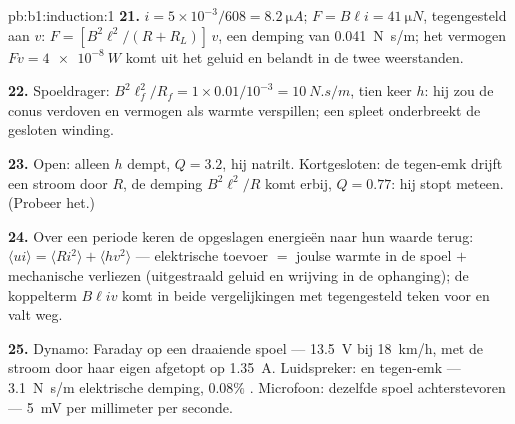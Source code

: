 \begin{solution}{pb:b1:induction:1}
\textbf{21.} $i = 5 \times 10^{-3}/608 = \qty{8.2}{\micro A}$; $F = B\ell i = \qty{41}{\micro N}$,
tegengesteld aan $v$: $F = [B^2\ell^2/(R + R_L)]\,v$, een demping van \qty{0.041}{N.s/m};
het vermogen $Fv = \qty{4e-8}{W}$ komt uit het geluid en belandt in de
twee weerstanden.

\textbf{22.} Spoeldrager: $B^2\ell_f^2/R_f = 1 \times 0.01/10^{-3} = \qty{10}{N.s/m}$, tien
keer $h$: hij zou de conus verdoven en vermogen als warmte verspillen; een spleet
onderbreekt de gesloten winding.

\textbf{23.} Open: alleen $h$ dempt, $Q = 3.2$, hij natrilt. Kortgesloten: de
tegen-emk drijft een stroom door $R$, de demping $B^2\ell^2/R$ komt erbij,
$Q = 0.77$: hij stopt meteen. (Probeer het.)

\textbf{24.} Over een periode keren de opgeslagen energieën naar hun waarde terug:
$\langle ui\rangle = \langle Ri^2\rangle + \langle hv^2\rangle$ --- elektrische toevoer $=$
joulse warmte in de spoel $+$ mechanische verliezen (uitgestraald geluid en
wrijving in de ophanging); de koppelterm $B\ell iv$ komt in beide
vergelijkingen met tegengesteld teken voor en valt weg.

\textbf{25.} Dynamo: Faraday op een draaiende spoel --- \qty{13.5}{V} bij
\qty{18}{km/h}, met de stroom door haar eigen  afgetopt op \qty{1.35}{A}.
Luidspreker:  en tegen-emk --- \qty{3.1}{N.s/m} elektrische
demping, $0.08\%$ . Microfoon: dezelfde spoel achterstevoren ---
\qty{5}{mV} per millimeter per seconde.
\end{solution}
